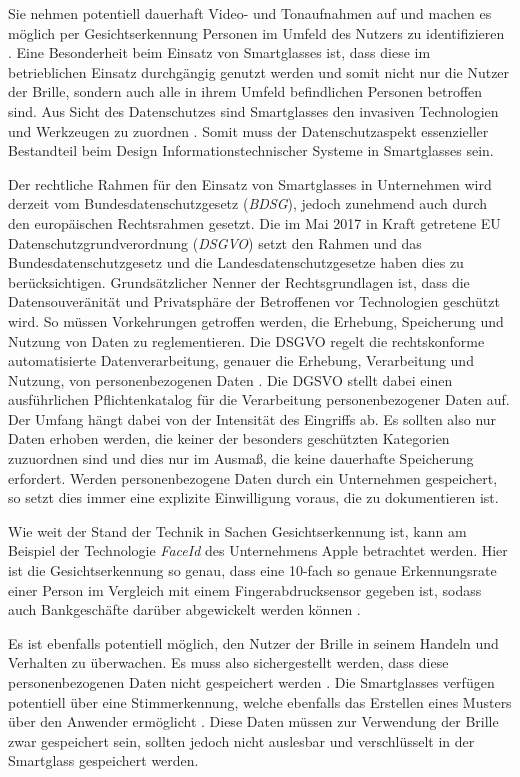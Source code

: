 Sie nehmen potentiell dauerhaft Video- und Tonaufnahmen auf und machen es möglich per Gesichtserkennung Personen im Umfeld des Nutzers zu identifizieren \cite[S.~38f]{Schwenke2016}. Eine Besonderheit beim Einsatz von Smartglasses ist, dass diese im betrieblichen Einsatz durchgängig genutzt werden und somit nicht nur die Nutzer der Brille, sondern auch alle in ihrem Umfeld befindlichen Personen betroffen sind. Aus Sicht des Datenschutzes sind Smartglasses den invasiven Technologien und Werkzeugen zu zuordnen \cite{Berkemeier2017}. Somit muss der Datenschutzaspekt essenzieller Bestandteil beim Design Informationstechnischer Systeme in Smartglasses sein. 

Der rechtliche Rahmen für den Einsatz von Smartglasses in Unternehmen wird derzeit vom Bundesdatenschutzgesetz (\emph{BDSG}), jedoch zunehmend auch durch den europäischen Rechtsrahmen gesetzt. Die im Mai 2017 in Kraft getretene EU Datenschutzgrundverordnung (\emph{DSGVO}) setzt den Rahmen und das Bundesdatenschutzgesetz und die Landesdatenschutzgesetze haben dies zu berücksichtigen. Grundsätzlicher Nenner der Rechtsgrundlagen ist, dass die Datensouveränität und Privatsphäre der Betroffenen vor Technologien geschützt wird. So müssen Vorkehrungen getroffen werden, die Erhebung, Speicherung und Nutzung von Daten zu reglementieren.
Die DSGVO regelt die rechtskonforme automatisierte Datenverarbeitung, genauer die Erhebung, Verarbeitung und Nutzung, von personenbezogenen Daten \cite{Berkemeier2017}. Die DGSVO stellt dabei einen ausführlichen Pflichtenkatalog für die Verarbeitung personenbezogener Daten auf. Der Umfang hängt dabei von der Intensität des Eingriffs ab. Es sollten also nur Daten erhoben werden, die keiner der besonders geschützten Kategorien zuzuordnen sind und dies nur im Ausmaß, die keine dauerhafte Speicherung erfordert. Werden personenbezogene Daten durch ein Unternehmen gespeichert, so setzt dies immer eine explizite Einwilligung voraus, die zu dokumentieren ist.

Wie weit der Stand der Technik in Sachen Gesichtserkennung ist, kann am Beispiel der Technologie \emph{FaceId} des Unternehmens Apple betrachtet werden. Hier ist die Gesichtserkennung so genau, dass eine 10-fach so genaue Erkennungsrate einer Person im Vergleich mit einem Fingerabdrucksensor gegeben ist, sodass auch Bankgeschäfte darüber abgewickelt werden können \cite{Apple2018a}. 

Es ist ebenfalls potentiell möglich, den Nutzer der Brille in seinem Handeln und Verhalten zu überwachen. Es muss also sichergestellt werden, dass diese personenbezogenen Daten nicht gespeichert werden \cite[S.~34]{Schwenke2016}. Die Smartglasses verfügen potentiell über eine Stimmerkennung, welche ebenfalls das Erstellen eines Musters über den Anwender ermöglicht \cite[S.~41]{Schwenke2016}. Diese Daten müssen zur Verwendung der Brille zwar gespeichert sein, sollten jedoch nicht auslesbar und verschlüsselt in der Smartglass gespeichert werden.

